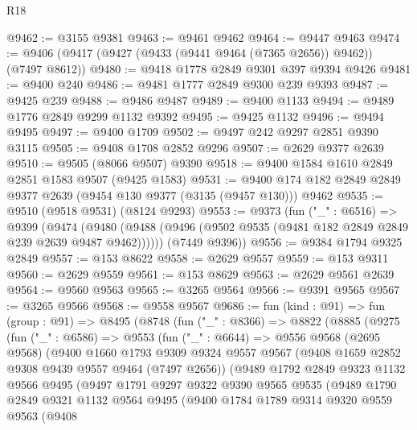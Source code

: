 \begin{lexlean}{R18}
\begin{coremodule}
@9462 := @3155 @9381
@9463 := @9461 @9462
@9464 := @9447 @9463
@9474 := @9406 (@9417 (@9427 (@9433 (@9441 @9464 (@7365 @2656)) @9462)) (@7497 @8612))
@9480 := @9418 @1778 @2849 @9301 @397 @9394 @9426
@9481 := @9400 @240
@9486 := @9481 @1777 @2849 @9300 @239 @9393
@9487 := @9425 @239
@9488 := @9486 @9487
@9489 := @9400 @1133
@9494 := @9489 @1776 @2849 @9299 @1132 @9392
@9495 := @9425 @1132
@9496 := @9494 @9495
@9497 := @9400 @1709
@9502 := @9497 @242 @9297 @2851 @9390 @3115
@9505 := @9408 @1708 @2852 @9296
@9507 := @2629 @9377 @2639
@9510 := @9505 (@8066 @9507) @9390
@9518 := @9400 @1584 @1610 @2849 @2851 @1583 @9507 (@9425 @1583)
@9531 := @9400 @174 @182 @2849 @2849 @9377 @2639 (@9454 @130 @9377 (@3135 (@9457 @130))) @9462
@9535 := @9510 (@9518 @9531) (@8124 @9293)
@9553 := @9373
    (fun ("_" : @6516) =>
    @9399
      (@9474 (@9480 (@9488 (@9496 (@9502 @9535 (@9481 @182 @2849 @2849 @239 @2639 @9487 @9462))))))
      (@7449 @9396))
@9556 := @9384 @1794 @9325 @2849
@9557 := @153 @8622
@9558 := @2629 @9557
@9559 := @153 @9311
@9560 := @2629 @9559
@9561 := @153 @8629
@9563 := @2629 @9561 @2639
@9564 := @9560 @9563
@9565 := @3265 @9564
@9566 := @9391 @9565
@9567 := @3265 @9566
@9568 := @9558 @9567
@9686 := fun (kind : @91) =>
  fun (group : @91) =>
  @8495
    (@8748
      (fun ("_" : @8366) =>
      @8822
        (@8885
          (@9275
            (fun ("_" : @6586) =>
            @9553
              (fun ("_" : @6644) =>
              @9556
                @9568
                (@2695 @9568)
                (@9400
                  @1660
                  @1793
                  @9309
                  @9324
                  @9557
                  @9567
                  (@9408 @1659 @2852 @9308 @9439 @9557 @9464 (@7497 @2656))
                  (@9489
                    @1792
                    @2849
                    @9323
                    @1132
                    @9566
                    @9495
                    (@9497
                      @1791
                      @9297
                      @9322
                      @9390
                      @9565
                      @9535
                      (@9489
                        @1790
                        @2849
                        @9321
                        @1132
                        @9564
                        @9495
                        (@9400
                          @1784
                          @1789
                          @9314
                          @9320
                          @9559
                          @9563
                          (@9408

\end{coremodule}
\end{lexlean}
